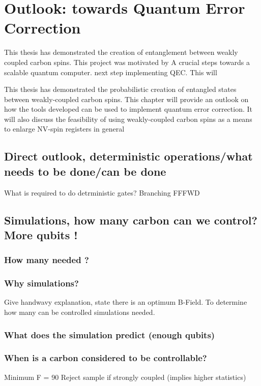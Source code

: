 \chapter{Outlook: towards Quantum Error Correction}
This thesis has demonstrated the creation of entanglement between weakly coupled carbon spins.
This project was motivated by
A crucial steps towards a scalable quantum computer.
next step implementing QEC.
This will

This thesis has demonstrated the probabilistic creation of entangled states between weakly-coupled carbon spins.
This chapter will provide an outlook on how the tools developed can be used to implement quantum error correction.
It will also discuss the feasibility of using weakly-coupled carbon spins as a means to enlarge NV-spin registers in general

\section{Direct outlook, deterministic operations/what needs to be done/can be done}
What is required to do detrministic gates?
Branching
FFFWD



\section{Simulations, how many carbon can we control? More qubits !  }

\subsection{How many needed ?}
\subsection{Why simulations? }
Give handwavy explanation, state there is an optimum B-Field. To determine how many can be controlled simulations needed.

\subsection{What does the simulation predict (enough qubits)}
\subsection{When is a carbon considered to be controllable? }
Minimum F = 90
Reject sample if strongly coupled (implies higher statistics)

